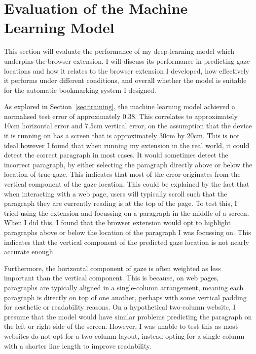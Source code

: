 \documentclass{report}
\begin{document}
\section{Evaluation of the Machine Learning Model}\label{sec:itracker-eval}

This section will evaluate the performance of my deep-learning model which underpins the browser extension. I will discuss its performance in predicting gaze locations and how it relates to the browser extension I developed, how effectively it performs under different conditions, and overall whether the model is suitable for the automatic bookmarking system I designed.

As explored in Section~\ref{sec:training}, the machine learning model achieved a normalised test error of approximately 0.38. This correlates to approximately 10cm horizontal error and 7.5cm vertical error, on the assumption that the device it is running on has a screen that is approximately 30cm by 20cm. This is not ideal however I found that when running my extension in the real world, it could detect the correct paragraph in most cases. It would sometimes detect the incorrect paragraph, by either selecting the paragraph directly above or below the location of true gaze. This indicates that most of the error originates from the vertical component of the gaze location. This could be explained by the fact that when interacting with a web page, users will typically scroll such that the paragraph they are currently reading is at the top of the page. To test this, I tried using the extension and focussing on a paragraph in the middle of a screen. When I did this, I found that the browser extension would opt to highlight paragraphs above or below the location of the paragraph I was focussing on. This indicates that the vertical component of the predicted gaze location is not nearly accurate enough. 

Furthermore, the horizontal component of gaze is often weighted as less important than the vertical component. This is because, on web pages, paragraphs are typically aligned in a single-column arrangement, meaning each paragraph is directly on top of one another, perhaps with some vertical padding for aesthetic or readability reasons. On a hypothetical two-column website, I presume that the model would have similar problems predicting the paragraph on the left or right side of the screen. However, I was unable to test this as most websites do not opt for a two-column layout, instead opting for a single column with a shorter line length to improve readability. 
\end{document}
